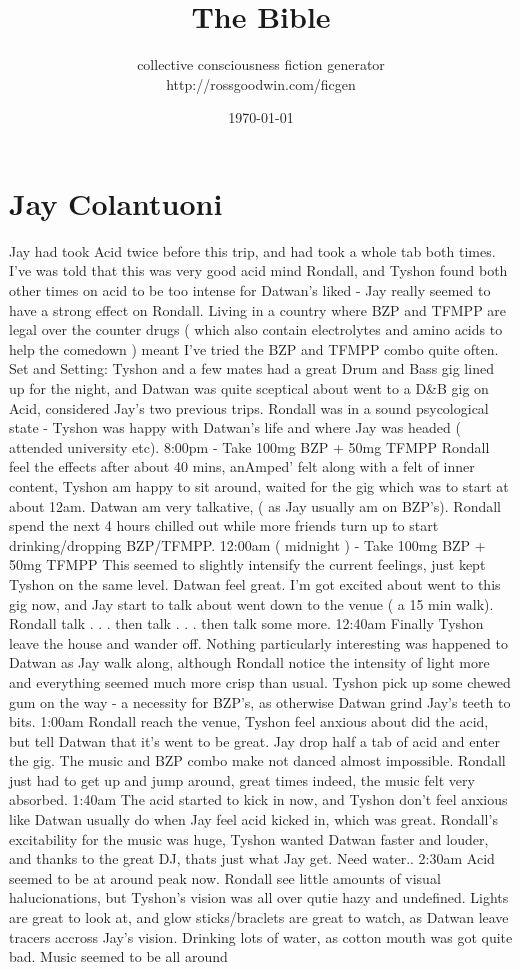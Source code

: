 \documentclass[12pt]{book}
\title{The Bible}
\author{collective consciousness fiction generator\\http://rossgoodwin.com/ficgen}
\date{\today}
\begin{document}
\maketitle



\chapter{Jay Colantuoni}

Jay had took Acid twice before this trip, and had took a whole tab both times. I've was told that this was very good acid mind Rondall, and Tyshon found both other times on acid to be too intense for Datwan's liked - Jay really seemed to have a strong effect on Rondall. Living in a country where BZP and TFMPP are legal over the counter drugs ( which also contain electrolytes and amino acids to help the comedown ) meant I've tried the BZP and TFMPP combo quite often. Set and Setting: Tyshon and a few mates had a great Drum and Bass gig lined up for the night, and Datwan was quite sceptical about went to a D\&B gig on Acid, considered Jay's two previous trips. Rondall was in a sound psycological state - Tyshon was happy with Datwan's life and where Jay was headed ( attended university etc). 8:00pm - Take 100mg BZP + 50mg TFMPP Rondall feel the effects after about 40 mins, anAmped' felt along with a felt of inner content, Tyshon am happy to sit around, waited for the gig which was to start at about 12am. Datwan am very talkative, ( as Jay usually am on BZP's). Rondall spend the next 4 hours chilled out while more friends turn up to start drinking/dropping BZP/TFMPP. 12:00am ( midnight ) - Take 100mg BZP + 50mg TFMPP This seemed to slightly intensify the current feelings, just kept Tyshon on the same level. Datwan feel great. I'm got excited about went to this gig now, and Jay start to talk about went down to the venue ( a 15 min walk). Rondall talk . . .  then talk . . .  then talk some more. 12:40am Finally Tyshon leave the house and wander off. Nothing particularly interesting was happened to Datwan as Jay walk along, although Rondall notice the intensity of light more and everything seemed much more crisp than usual. Tyshon pick up some chewed gum on the way - a necessity for BZP's, as otherwise Datwan grind Jay's teeth to bits. 1:00am Rondall reach the venue, Tyshon feel anxious about did the acid, but tell Datwan that it's went to be great. Jay drop half a tab of acid and enter the gig. The music and BZP combo make not danced almost impossible. Rondall just had to get up and jump around, great times indeed, the music felt very absorbed. 1:40am The acid started to kick in now, and Tyshon don't feel anxious like Datwan usually do when Jay feel acid kicked in, which was great. Rondall's excitability for the music was huge, Tyshon wanted Datwan faster and louder, and thanks to the great DJ, thats just what Jay get. Need water.. 2:30am Acid seemed to be at around peak now. Rondall see little amounts of visual halucionations, but Tyshon's vision was all over qutie hazy and undefined. Lights are great to look at, and glow sticks/braclets are great to watch, as Datwan leave tracers accross Jay's vision. Drinking lots of water, as cotton mouth was got quite bad. Music seemed to be all around 
\end{document}
